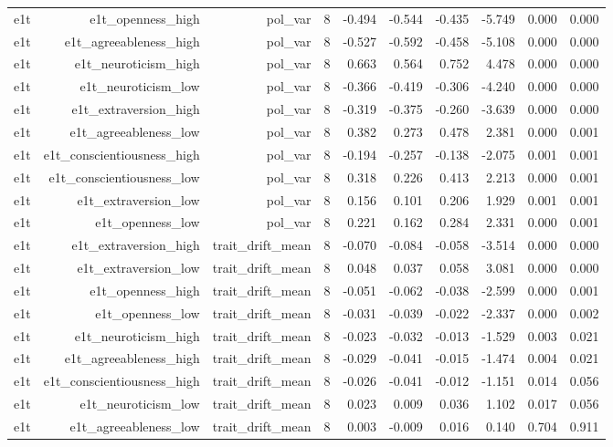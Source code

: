 \documentclass[11pt]{article}
\begin{document}
\begin{landscape}
\begin{longtable}{@{}lrrrrrrrrr@{}}
e1t & e1t\_openness\_high & pol\_var & 8 & -0.494 & -0.544 & -0.435 & -5.749 & 0.000 & 0.000 \\
e1t & e1t\_agreeableness\_high & pol\_var & 8 & -0.527 & -0.592 & -0.458 & -5.108 & 0.000 & 0.000 \\
e1t & e1t\_neuroticism\_high & pol\_var & 8 & 0.663 & 0.564 & 0.752 & 4.478 & 0.000 & 0.000 \\
e1t & e1t\_neuroticism\_low & pol\_var & 8 & -0.366 & -0.419 & -0.306 & -4.240 & 0.000 & 0.000 \\
e1t & e1t\_extraversion\_high & pol\_var & 8 & -0.319 & -0.375 & -0.260 & -3.639 & 0.000 & 0.000 \\
e1t & e1t\_agreeableness\_low & pol\_var & 8 & 0.382 & 0.273 & 0.478 & 2.381 & 0.000 & 0.001 \\
e1t & e1t\_conscientiousness\_high & pol\_var & 8 & -0.194 & -0.257 & -0.138 & -2.075 & 0.001 & 0.001 \\
e1t & e1t\_conscientiousness\_low & pol\_var & 8 & 0.318 & 0.226 & 0.413 & 2.213 & 0.000 & 0.001 \\
e1t & e1t\_extraversion\_low & pol\_var & 8 & 0.156 & 0.101 & 0.206 & 1.929 & 0.001 & 0.001 \\
e1t & e1t\_openness\_low & pol\_var & 8 & 0.221 & 0.162 & 0.284 & 2.331 & 0.000 & 0.001 \\
e1t & e1t\_extraversion\_high & trait\_drift\_mean & 8 & -0.070 & -0.084 & -0.058 & -3.514 & 0.000 & 0.000 \\
e1t & e1t\_extraversion\_low & trait\_drift\_mean & 8 & 0.048 & 0.037 & 0.058 & 3.081 & 0.000 & 0.000 \\
e1t & e1t\_openness\_high & trait\_drift\_mean & 8 & -0.051 & -0.062 & -0.038 & -2.599 & 0.000 & 0.001 \\
e1t & e1t\_openness\_low & trait\_drift\_mean & 8 & -0.031 & -0.039 & -0.022 & -2.337 & 0.000 & 0.002 \\
e1t & e1t\_neuroticism\_high & trait\_drift\_mean & 8 & -0.023 & -0.032 & -0.013 & -1.529 & 0.003 & 0.021 \\
e1t & e1t\_agreeableness\_high & trait\_drift\_mean & 8 & -0.029 & -0.041 & -0.015 & -1.474 & 0.004 & 0.021 \\
e1t & e1t\_conscientiousness\_high & trait\_drift\_mean & 8 & -0.026 & -0.041 & -0.012 & -1.151 & 0.014 & 0.056 \\
e1t & e1t\_neuroticism\_low & trait\_drift\_mean & 8 & 0.023 & 0.009 & 0.036 & 1.102 & 0.017 & 0.056 \\
e1t & e1t\_agreeableness\_low & trait\_drift\_mean & 8 & 0.003 & -0.009 & 0.016 & 0.140 & 0.704 & 0.911 \\

\end{longtable}
\end{landscape}
\end{document}
